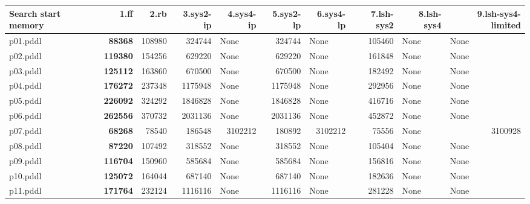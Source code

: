 \documentclass{article}
\begin{document}
\begin{tabular}{@{}lrrrrrrrrr@{}}
Search start memory & 1.ff & 2.rb & 3.sys2-ip & 4.sys4-ip & 5.sys2-lp & 6.sys4-lp & 7.lsh-sys2 & 8.lsh-sys4 & 9.lsh-sys4-limited \\
\midrule
p01.pddl & \textbf{88368} & 108980 & 324744 & \multicolumn{1}{|l|}{None} & 324744 & \multicolumn{1}{|l|}{None} & 105460 & \multicolumn{1}{|l|}{None} & \multicolumn{1}{|l|}{None} \\
p02.pddl & \textbf{119380} & 154256 & 629220 & \multicolumn{1}{|l|}{None} & 629220 & \multicolumn{1}{|l|}{None} & 161848 & \multicolumn{1}{|l|}{None} & \multicolumn{1}{|l|}{None} \\
p03.pddl & \textbf{125112} & 163860 & 670500 & \multicolumn{1}{|l|}{None} & 670500 & \multicolumn{1}{|l|}{None} & 182492 & \multicolumn{1}{|l|}{None} & \multicolumn{1}{|l|}{None} \\
p04.pddl & \textbf{176272} & 237348 & 1175948 & \multicolumn{1}{|l|}{None} & 1175948 & \multicolumn{1}{|l|}{None} & 292956 & \multicolumn{1}{|l|}{None} & \multicolumn{1}{|l|}{None} \\
p05.pddl & \textbf{226092} & 324292 & 1846828 & \multicolumn{1}{|l|}{None} & 1846828 & \multicolumn{1}{|l|}{None} & 416716 & \multicolumn{1}{|l|}{None} & \multicolumn{1}{|l|}{None} \\
p06.pddl & \textbf{262556} & 370732 & 2031136 & \multicolumn{1}{|l|}{None} & 2031136 & \multicolumn{1}{|l|}{None} & 452872 & \multicolumn{1}{|l|}{None} & \multicolumn{1}{|l|}{None} \\
p07.pddl & \textbf{68268} & 78540 & 186548 & 3102212 & 180892 & 3102212 & 75556 & \multicolumn{1}{|l|}{None} & 3100928 \\
p08.pddl & \textbf{87220} & 107492 & 318552 & \multicolumn{1}{|l|}{None} & 318552 & \multicolumn{1}{|l|}{None} & 105404 & \multicolumn{1}{|l|}{None} & \multicolumn{1}{|l|}{None} \\
p09.pddl & \textbf{116704} & 150960 & 585684 & \multicolumn{1}{|l|}{None} & 585684 & \multicolumn{1}{|l|}{None} & 156816 & \multicolumn{1}{|l|}{None} & \multicolumn{1}{|l|}{None} \\
p10.pddl & \textbf{125072} & 164044 & 687140 & \multicolumn{1}{|l|}{None} & 687140 & \multicolumn{1}{|l|}{None} & 182636 & \multicolumn{1}{|l|}{None} & \multicolumn{1}{|l|}{None} \\
p11.pddl & \textbf{171764} & 232124 & 1116116 & \multicolumn{1}{|l|}{None} & 1116116 & \multicolumn{1}{|l|}{None} & 281228 & \multicolumn{1}{|l|}{None} & \multicolumn{1}{|l|}{None} \\

\end{tabular}
\end{document}
